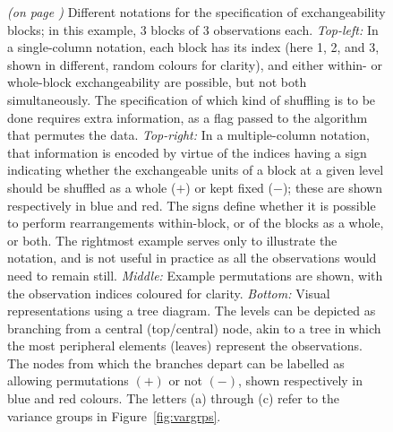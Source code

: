 \begin{figure}[!b]
\centering
\caption{\emph{(on page \pageref{fig:notation_noref})} Different notations for the specification of exchangeability blocks; in this example, 3 blocks of 3 observations each.
\emph{Top-left:} In a single-column notation, each block has its index (here 1, 2, and 3, shown in different, random colours for clarity), and either within- or whole-block exchangeability are possible, but not both simultaneously. The specification of which kind of shuffling is to be done requires extra information, as a flag passed to the algorithm that permutes the data.
\emph{Top-right:} In a multiple-column notation, that information is encoded by virtue of the indices having a sign indicating whether the exchangeable units of a block at a given level should be shuffled as a whole ($+$) or kept fixed ($-$); these are shown respectively in blue and red. The signs define whether it is possible to perform rearrangements within-block, or of the blocks as a whole, or both. The rightmost example serves only to illustrate the notation, and is not useful in practice as all the observations would need to remain still.
\emph{Middle:} Example permutations are shown, with the observation indices coloured for clarity.
\emph{Bottom:} Visual representations using a tree diagram. The levels can be depicted as branching from a central (top/central) node, akin to a tree in which the most peripheral elements (leaves) represent the observations. The nodes from which the branches depart can be labelled as allowing permutations $(+)$ or not $(-)$, shown respectively in blue and red colours. The letters (a) through (c) refer to the variance groups in Figure~\ref{fig:vargrps}.}
\label{fig:notation}
\end{figure}

